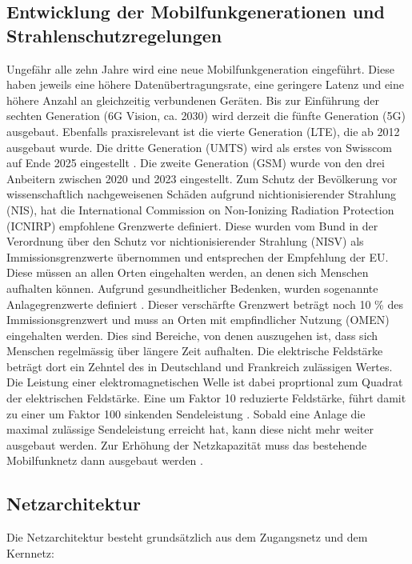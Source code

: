 \subsection{Entwicklung der Mobilfunkgenerationen und Strahlenschutzregelungen}
Ungefähr alle zehn Jahre wird eine neue Mobilfunkgeneration eingeführt. Diese haben jeweils eine höhere Datenübertragungsrate, eine geringere Latenz und eine höhere Anzahl an gleichzeitig verbundenen Geräten. Bis zur Einführung der sechten Generation (6G Vision, ca. 2030) wird derzeit die fünfte Generation (5G) ausgebaut. Ebenfalls praxisrelevant ist die vierte Generation (LTE), die ab 2012 ausgebaut wurde. Die dritte Generation (UMTS) wird als erstes von Swisscom auf Ende 2025 eingestellt \cite{swisscomAbschaltung3GErneuerung}. Die zweite Generation (GSM) wurde von den drei Anbeitern zwischen 2020 und 2023 eingestellt.
Zum Schutz der Bevölkerung vor wissenschaftlich nachgeweisenen Schäden aufgrund nichtionisierender Strahlung (NIS), hat die International Commission on Non-Ionizing Radiation Protection (ICNIRP) empfohlene Grenzwerte definiert. Diese wurden vom Bund in der Verordnung über den Schutz vor nichtionisierender Strahlung (NISV) als Immissionsgrenzwerte übernommen und entsprechen der Empfehlung der EU. Diese müssen an allen Orten eingehalten werden, an denen sich Menschen aufhalten können. Aufgrund gesundheitlicher Bedenken, wurden sogenannte Anlagegrenzwerte definiert \cite{baumannMitVerordnungUeber2005}. Dieser verschärfte Grenzwert beträgt noch 10 \% des Immissionsgrenzwert und muss an Orten mit empfindlicher Nutzung (OMEN) eingehalten werden. Dies sind Bereiche, von denen auszugehen ist, dass sich Menschen regelmässig über längere Zeit aufhalten. Die elektrische Feldstärke beträgt dort ein Zehntel des in Deutschland und Frankreich zulässigen Wertes. Die Leistung einer elektromagnetischen Welle ist dabei proprtional zum Quadrat der elektrischen Feldstärke. Eine um Faktor 10 reduzierte Feldstärke, führt damit zu einer um Faktor 100 sinkenden Sendeleistung \cite{chance5gAnlagegrenzwerteImMobilfunk}.
Sobald eine Anlage die maximal zulässige Sendeleistung erreicht hat, kann diese nicht mehr weiter ausgebaut werden. Zur Erhöhung der Netzkapazität muss das bestehende Mobilfunknetz dann ausgebaut werden \cite{bundesratNachhaltigesMobilfunknetzBericht2022}.

\subsection{Netzarchitektur}
Die Netzarchitektur besteht grundsätzlich aus dem Zugangsnetz und dem Kernnetz:

